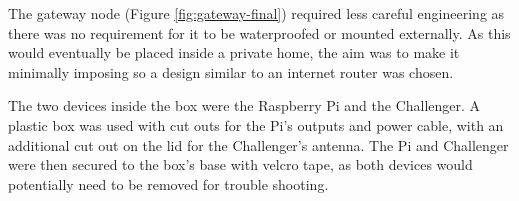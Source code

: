 The gateway node (Figure \ref{fig:gateway-final}) required less careful
engineering as there was no requirement for it to be waterproofed or mounted
externally. As this would eventually be placed inside a private home, the aim
was to make it minimally imposing so a design similar to an internet router was
chosen.

The two devices inside the box were the Raspberry Pi and the Challenger. A
plastic box was used with cut outs for the Pi's outputs and power cable, with an
additional cut out on the lid for the Challenger's antenna. The Pi and
Challenger were then secured to the box's base with velcro tape, as both devices
would potentially need to be removed for trouble shooting.